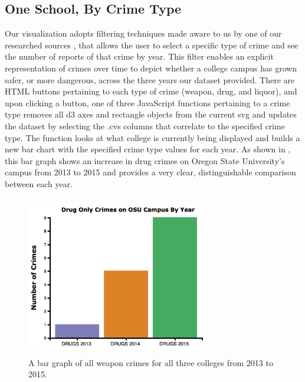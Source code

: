 \documentclass[journal]{vgtc}                %
\begin{document}
\subsection{One School, By Crime Type}
Our visualization adopts filtering techniques made aware to us by one of our researched sources \cite{ kogan_2013 }, that allows the user to select a specific type of crime and see the number of reports of that crime by year.  This filter enables an explicit representation of crimes over time to depict whether a college campus has grown safer, or more dangerous, across the three years our dataset provided. There are HTML buttons pertaining to each type of crime (weapon, drug, and liquor), and upon clicking a button, one of three JavaScript functions pertaining to a crime type removes all d3 axes and rectangle objects from the current svg and updates the dataset by selecting the .cvs columns that correlate to the specified crime type. The function looks at what college is currently being displayed and builds a new bar chart with the specified crime type values for each year. As shown in , this bar graph shows an increase in drug crimes on Oregon State University's campus from 2013 to 2015 and provides a very clear, distinguishable comparison between each year.
\begin{figure}[H]
\label{fig:OneSchoolOneType}
\centering
\includegraphics[width=8cm, height=7cm]{OneSchoolOneType}
\caption{A bar graph of all weapon crimes for all three colleges from 2013 to 2015.}
\end{figure}
\end{document}
